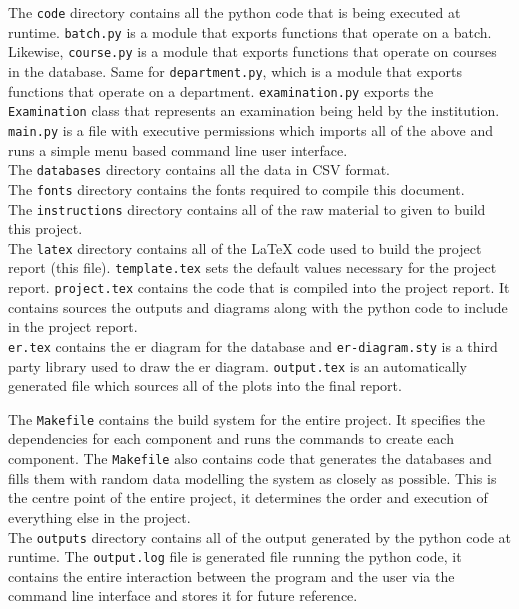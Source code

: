 \documentclass{article}
\begin{document}
		The \texttt{code} directory contains all the python code that is being executed at runtime.
		\texttt{batch.py} is a module that exports functions that operate on a batch.
		Likewise, \texttt{course.py} is a module that exports functions that operate on courses in the database.
		Same for \texttt{department.py}, which is a module that exports functions that operate on a department.
		\texttt{examination.py} exports the \texttt{Examination} class that represents an examination being held by the institution.\\
		\texttt{main.py} is a file with executive permissions which imports all of the above and runs a simple menu based command line user interface.\\

		The \texttt{databases} directory contains all the data in CSV format.\\

		The \texttt{fonts} directory contains the fonts required to compile this document.\\

		The \texttt{instructions} directory contains all of the raw material to given to build this project.\\

		The \texttt{latex} directory contains all of the \LaTeX{} code used to build the project report (this file).
		\texttt{template.tex} sets the default values necessary for the project report.
		\texttt{project.tex} contains the code that is compiled into the project report. It contains sources the outputs and diagrams along with the python code to include in the project report.\\
		\texttt{er.tex} contains the er diagram for the database and \texttt{er-diagram.sty} is a third party library used to draw the er diagram.
		\texttt{output.tex} is an automatically generated file which sources all of the plots into the final report.

		The \texttt{Makefile} contains the build system for the entire project. It specifies the dependencies for each component and runs the commands to create each component. The \texttt{Makefile} also contains code that generates the databases and fills them with random data modelling the system as closely as possible. This is the centre point of the entire project, it determines the order and execution of everything else in the project.\\

		The \texttt{outputs} directory contains all of the output generated by the python code at runtime.
		The \texttt{output.log} file is generated file running the python code, it contains the entire interaction between the program and the user via the command line interface and stores it for future reference.
\end{document}
